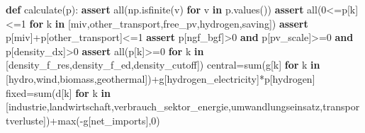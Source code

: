 \documentclass[
  ngerman,
  a4paper,
  DIV=11]{scrreprt}
\newenvironment{Shaded}{\begin{snugshade}}{\end{snugshade}}
\newcommand{\BuiltInTok}[1]{\textcolor[rgb]{0.00,0.23,0.31}{#1}}
\newcommand{\ControlFlowTok}[1]{\textcolor[rgb]{0.00,0.23,0.31}{\textbf{#1}}}
\newcommand{\DecValTok}[1]{\textcolor[rgb]{0.68,0.00,0.00}{#1}}
\newcommand{\KeywordTok}[1]{\textcolor[rgb]{0.00,0.23,0.31}{\textbf{#1}}}
\newcommand{\NormalTok}[1]{\textcolor[rgb]{0.00,0.23,0.31}{#1}}
\newcommand{\OperatorTok}[1]{\textcolor[rgb]{0.37,0.37,0.37}{#1}}
\newcommand{\StringTok}[1]{\textcolor[rgb]{0.13,0.47,0.30}{#1}}
\begin{document}
\begin{Shaded}
\begin{Highlighting}[]
\KeywordTok{def}\NormalTok{ calculate(p):}
    \ControlFlowTok{assert} \BuiltInTok{all}\NormalTok{(np.isfinite(v) }\ControlFlowTok{for}\NormalTok{ v }\KeywordTok{in}\NormalTok{ p.values())}
    \ControlFlowTok{assert} \BuiltInTok{all}\NormalTok{(}\DecValTok{0}\OperatorTok{\textless{}=}\NormalTok{p[k]}\OperatorTok{\textless{}=}\DecValTok{1} \ControlFlowTok{for}\NormalTok{ k }\KeywordTok{in}\NormalTok{ [}\StringTok{\textquotesingle{}miv\textquotesingle{}}\NormalTok{,}\StringTok{\textquotesingle{}other\_transport\textquotesingle{}}\NormalTok{,}\StringTok{\textquotesingle{}free\_pv\textquotesingle{}}\NormalTok{,}\StringTok{\textquotesingle{}hydrogen\textquotesingle{}}\NormalTok{,}\StringTok{\textquotesingle{}saving\textquotesingle{}}\NormalTok{])}
    \ControlFlowTok{assert}\NormalTok{ p[}\StringTok{\textquotesingle{}miv\textquotesingle{}}\NormalTok{]}\OperatorTok{+}\NormalTok{p[}\StringTok{\textquotesingle{}other\_transport\textquotesingle{}}\NormalTok{]}\OperatorTok{\textless{}=}\DecValTok{1}
    \ControlFlowTok{assert}\NormalTok{ p[}\StringTok{\textquotesingle{}ngf\_bgf\textquotesingle{}}\NormalTok{]}\OperatorTok{\textgreater{}}\DecValTok{0} \KeywordTok{and}\NormalTok{ p[}\StringTok{\textquotesingle{}pv\_scale\textquotesingle{}}\NormalTok{]}\OperatorTok{\textgreater{}=}\DecValTok{0} \KeywordTok{and}\NormalTok{ p[}\StringTok{\textquotesingle{}density\_dx\textquotesingle{}}\NormalTok{]}\OperatorTok{\textgreater{}}\DecValTok{0}
    \ControlFlowTok{assert} \BuiltInTok{all}\NormalTok{(p[k]}\OperatorTok{\textgreater{}=}\DecValTok{0} \ControlFlowTok{for}\NormalTok{ k }\KeywordTok{in}\NormalTok{ [}\StringTok{\textquotesingle{}density\_f\_res\textquotesingle{}}\NormalTok{,}\StringTok{\textquotesingle{}density\_f\_ed\textquotesingle{}}\NormalTok{,}\StringTok{\textquotesingle{}density\_cutoff\textquotesingle{}}\NormalTok{])}
\NormalTok{    central}\OperatorTok{=}\BuiltInTok{sum}\NormalTok{(g[k] }\ControlFlowTok{for}\NormalTok{ k }\KeywordTok{in}\NormalTok{ [}\StringTok{\textquotesingle{}hydro\textquotesingle{}}\NormalTok{,}\StringTok{\textquotesingle{}wind\textquotesingle{}}\NormalTok{,}\StringTok{\textquotesingle{}biomass\textquotesingle{}}\NormalTok{,}\StringTok{\textquotesingle{}geothermal\textquotesingle{}}\NormalTok{])}\OperatorTok{+}\NormalTok{g[}\StringTok{\textquotesingle{}hydrogen\_electricity\textquotesingle{}}\NormalTok{]}\OperatorTok{*}\NormalTok{p[}\StringTok{\textquotesingle{}hydrogen\textquotesingle{}}\NormalTok{]}
\NormalTok{    fixed}\OperatorTok{=}\BuiltInTok{sum}\NormalTok{(d[k] }\ControlFlowTok{for}\NormalTok{ k }\KeywordTok{in}\NormalTok{ [}\StringTok{\textquotesingle{}industrie\textquotesingle{}}\NormalTok{,}\StringTok{\textquotesingle{}landwirtschaft\textquotesingle{}}\NormalTok{,}\StringTok{\textquotesingle{}verbrauch\_sektor\_energie\textquotesingle{}}\NormalTok{,}\StringTok{\textquotesingle{}umwandlungseinsatz\textquotesingle{}}\NormalTok{,}\StringTok{\textquotesingle{}transportverluste\textquotesingle{}}\NormalTok{])}\OperatorTok{+}\BuiltInTok{max}\NormalTok{(}\OperatorTok{{-}}\NormalTok{g[}\StringTok{\textquotesingle{}net\_imports\textquotesingle{}}\NormalTok{],}\DecValTok{0}\NormalTok{)}

\end{Highlighting}
\end{Shaded}
\end{document}
